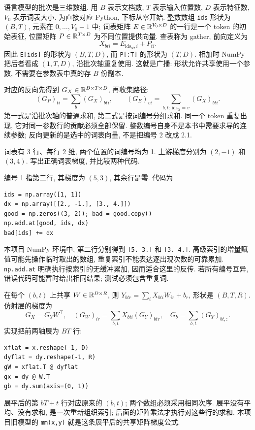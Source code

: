 \label{sec:tensor}
语言模型的批次是三维数组. 用 $B$ 表示文档数, $T$ 表示输入位置数, $D$ 表示特征数, $V_0$ 表示词表大小. 为直接对应 Python, 下标从零开始. 整数数组 \texttt{ids} 形状为 $(B,T)$, 元素在 $0,\ldots,V_0-1$ 中; 词表矩阵 $E\in\mathbb R^{V_0\times D}$ 的一行是一个 token 的初始表征, 位置矩阵 $P\in\mathbb R^{T\times D}$ 为不同位置提供向量. 查表称为 gather, 前向定义为
\[
X_{bti}=E_{\mathrm{ids}_{bt},i}+P_{ti}.
\]
因此 \texttt{E[ids]} 的形状为 $(B,T,D)$, 而 \texttt{P[:T]} 的形状为 $(T,D)$. 相加时 NumPy 把后者看成 $(1,T,D)$, 沿批次轴重复使用. 这就是广播: 形状允许共享使用一个参数, 不需要在参数表中真的存 $B$ 份副本.

对应的反向先得到 $G_X\in\mathbb R^{B\times T\times D}$, 再收集路径:
\[
(G_P)_{ti}=\sum_b(G_X)_{bti},\qquad
(G_E)_{vi}=\sum_{b,t:\,\mathrm{ids}_{bt}=v}(G_X)_{bti}.
\]
第一式是沿批次轴的普通求和, 第二式是按词编号分组求和. 同一个 token 重复出现, 它对同一参数行的贡献必须全部保留. 整数编号自身不是本书中需要求导的连续参数; 反向更新的是选中的词表向量, 不是把编号 2 改成 2.1.

\begin{example}
词表有 3 行、每行 2 维, 两个位置的词编号均为 1. 上游梯度分别为 $(2,-1)$ 和 $(3,4)$. 写出正确词表梯度, 并比较两种代码.
\end{example}
\begin{solution}
编号 1 指第二行, 其梯度为 $(5,3)$, 其余行是零. 代码为
\begin{verbatim}
ids = np.array([1, 1])
dx = np.array([[2., -1.], [3., 4.]])
good = np.zeros((3, 2)); bad = good.copy()
np.add.at(good, ids, dx)
bad[ids] += dx
\end{verbatim}
本项目 NumPy 环境中, 第二行分别得到 \texttt{[5. 3.]} 和 \texttt{[3. 4.]}. 高级索引的增量赋值可能先操作临时取出的数组, 重复索引不能表达逐出现次数的可靠累加. \texttt{np.add.at} 明确执行按索引的无缓冲累加, 因而适合这里的反传. 若所有编号互异, 错误代码可能暂时给出相同结果; 测试必须包含重复词.
\end{solution}

在每个 $(b,t)$ 上共享 $W\in\mathbb R^{D\times R}$, 则
$Y_{btr}=\sum_iX_{bti}W_{ir}+b_r$, 形状是 $(B,T,R)$. 仿射层的梯度为
\[
G_X=G_YW^\top,\quad
(G_W)_{ir}=\sum_{b,t}X_{bti}(G_Y)_{btr},\quad
G_b=\sum_{b,t}(G_Y)_{bt,:}.
\]
实现把前两轴展为 $BT$ 行:
\begin{verbatim}
xflat = x.reshape(-1, D)
dyflat = dy.reshape(-1, R)
gW = xflat.T @ dyflat
gx = dy @ W.T
gb = dy.sum(axis=(0, 1))
\end{verbatim}
展平后的第 $bT+t$ 行对应原来的 $(b,t)$; 两个数组必须采用相同次序. 展平没有平均、没有求和, 是一次重新组织索引; 后面的矩阵乘法才执行对这些行的求和. 本项目旧模型的 \texttt{mm(x,y)} 就是这条展平后的共享矩阵梯度公式.


